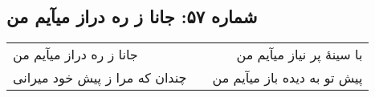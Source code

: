 \begin{center}
\section*{شماره ۵۷: جانا ز ره دراز میآیم من}
\label{sec:057}
\begin{longtable}{l p{0.5cm} r}
جانا ز ره دراز میآیم من
&&
با سینهٔ پر نیاز میآیم من
\\
چندان که مرا ز پیش خود میرانی
&&
پیش تو به دیده باز میآیم من
\\
\end{longtable}
\end{center}
